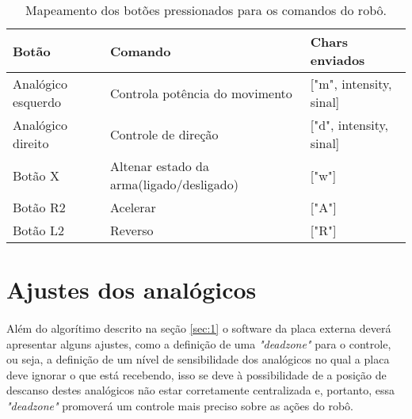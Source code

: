 \documentclass{article}
\begin{document}
        \begin{table}[H]
            \centering
            \caption{Mapeamento dos botões pressionados para os comandos do robô.}
            \label{tab:1}
            \begin{tabular}{|l|l|l|}
            \hline
            Botão              & Comando                                  & Chars  enviados             \\ \hline
            Analógico esquerdo & Controla potência do movimento           & {[}"m", intensity, sinal{]} \\
            Analógico direito  & Controle de direção                      & {[}"d", intensity, sinal{]} \\
            Botão X            & Altenar estado da arma(ligado/desligado) & {[}"w"{]}                   \\
            Botão R2           & Acelerar                                 & {[}"A"{]}                   \\
            Botão L2           & Reverso                                  & {[}"R"{]}                   \\ \hline
            \end{tabular}
        \end{table}

    \section{Ajustes dos analógicos}
        \paragraph{}
        Além do algorítimo descrito na seção \ref{sec:1} o software da placa externa deverá apresentar alguns ajustes, como a definição de uma \textit{"deadzone"} para o controle, ou seja, a definição de um nível de sensibilidade dos analógicos no qual a placa deve ignorar o que está recebendo, isso se deve à possibilidade de a posição de descanso destes analógicos não estar corretamente centralizada e, portanto, essa \textit{"deadzone"} promoverá um controle mais preciso sobre as ações do robô.
\end{document}
